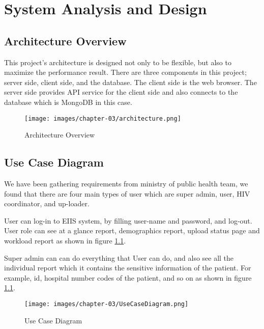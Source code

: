 \chapter{System Analysis and Design}

\section{Architecture Overview}
    This project's architecture is designed not only to be flexible, but also to maximize the performance result. There are three components in this project; server side, client side, and the database. The client side is the web browser. The server side provides API service for the client side and also connects to the database which is MongoDB in this case.
    
    \vspace{25mm}
    \FloatBarrier
    	\begin{figure}[h!]
            \centering
        		\texttt{[image: images/chapter-03/architecture.png]}
        		\caption{Architecture Overview}
        \end{figure}
	\FloatBarrier

\clearpage
\section{Use Case Diagram}
    
    We have been gathering requirements from ministry of public health team, we found that there are four main types of user which are super admin, user, HIV coordinator, and up-loader. 
    
    User can log-in to EIIS system, by filling user-name and password, and log-out. User role can see at a glance report, demographics report, upload status page and workload report as shown in figure \ref{use-case}.
    
    
    Super admin can can do everything that User can do, and also see all the individual report which it contains the sensitive information of the patient. For example, id, hospital number codes of the patient, and so on as shown in figure \ref{use-case}. 
    
    
    \FloatBarrier
    	\begin{figure}[h!]
            \centering
        		\texttt{[image: images/chapter-03/UseCaseDiagram.png]}
        		\caption{Use Case Diagram}
        		\label{use-case}
        \end{figure}
	\FloatBarrier
	
